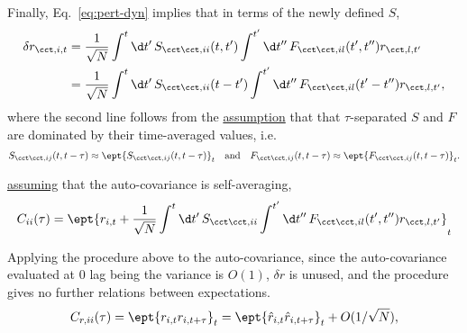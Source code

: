\documentclass[11pt,openany,oneside]{article} %
\begin{document}
Finally, Eq.~\ref{eq:pert-dyn} implies that in terms of the newly defined $S$,
\begin{equation}
  \label{eq:pert-sol}
  \begin{aligned}
    \delta r_{\cct,i,t} &= \frac{1}{\sqrt{N}}\int^t\d t'\,S_{\cct\cct,ii}(t,t') \int^{t'}\d t''\,F_{\cct\cct,il}(t',t'') r_{\cct,l,t'}\\
  &= \frac{1}{\sqrt{N}}\int^t\d t'\,S_{\cct\cct,ii}(t-t') \int^{t'}\d t''\,F_{\cct\cct,il}(t'-t'') r_{\cct,l,t'},
  \end{aligned}
\end{equation}
where the second line follows from the \uline{assumption} that that $\tau$-separated $S$ and $F$ are
dominated by their time-averaged values, i.e.
\begin{align*}
  S_{\cct\cct,ij}(t,t-\tau) \approx \ept{S_{\cct\cct,ij}(t,t-\tau)}_t\tand F_{\cct\cct,ij}(t,t-\tau) \approx \ept{F_{\cct\cct,ij}(t,t-\tau)}_t.
\end{align*}






\uline{assuming} that the auto-covariance is self-averaging,
\begin{equation}
  \label{eq:auto-cov}
  C_{ii}(\tau) = \ept{r_{i,t}+\frac{1}{\sqrt{N}}\int^t\d t'\,S_{\cct\cct,ii} \int^{t'}\d t''\,F_{\cct\cct,il}(t',t'') r_{\cct,l,t'}}_t
\end{equation}


Applying the procedure above to the auto-covariance, since the auto-covariance evaluated at $0$ lag
being the variance is $O(1)$, $\delta r$ is unused, and the procedure gives no further relations
between expectations.
\begin{align*}
  C_{r,ii}(\tau) = \ept{r_{i,t}r_{i,t+\tau}}_t = \ept{\hat{r}_{i,t}\hat{r}_{i,t+\tau}}_t + O(1/\sqrt{N}),
\end{align*}

%  
% 
\end{document}
